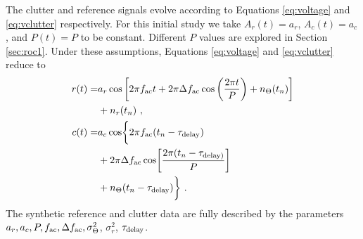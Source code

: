 \documentclass[pra,superscriptaddress,reprint,amsmath,amssymb,nofootinbib]{revtex4-2}
\begin{document}
The clutter and reference signals evolve according to Equations \eqref{eq:voltage} and \eqref{eq:vclutter} respectively. For this initial study we take $A_r(t) = a_r$, $A_c(t) = a_c$, and $P(t) = P$ to be constant. Different $P$ values are explored in Section \ref{sec:roc1}. Under these assumptions, Equations \eqref{eq:voltage} and \eqref{eq:vclutter} reduce to 
\begin{align}
 	r(t) = & a_r \cos \left[ 2 \pi f_{\rm ac} t +2 \pi \Delta f_{\rm ac} \cos\left(\frac{2 \pi t}{P}\right) + n_{\Theta} (t_n) \right] \nonumber \\ 
 	&+n_r(t_n) \ , \\ 
	c(t) = & a_c \cos \biggl \{ 2 \pi f_{\rm ac} (t_n - \tau_{\rm delay}) \nonumber \\ 
	&+ 2 \pi \Delta f_{\rm ac} \cos \biggl [ \frac{2 \pi (t_n - \tau_{\rm delay)}}{P} \biggr ] \nonumber \\ 
	&+ n_{\Theta} (t_n - \tau_{\rm delay}) \biggr \} \ .
	\label{eq:clutterequation}
\end{align}
The synthetic reference and clutter data are fully described by the parameters $a_r,a_c,P, f_{\rm ac}, \Delta f_{\rm ac},\sigma^2_{\Theta}$, $\sigma_r^2$, $\tau_{\rm delay}$. \newline 
\end{document}
